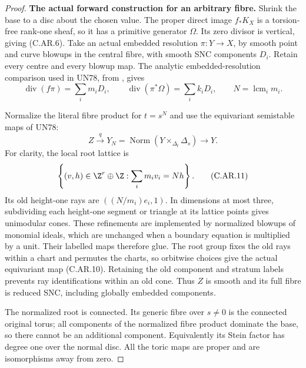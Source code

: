 \begin{proof}
\par\medskip\noindent\textbf{The actual forward construction for an arbitrary fibre.}
Shrink the base to a disc about the chosen value.
The proper direct image \(f_*K_X\) is a torsion-free
rank-one sheaf, so it has a primitive generator
\(\Omega\). Its zero divisor is vertical, giving
(C.AR.6). Take an actual embedded resolution
\(\pi:Y\to X\), by smooth point and curve blowups
in the central fibre, with smooth SNC components
\(D_i\). Retain every centre and every blowup map.
The analytic embedded-resolution comparison used
in UN78, from \cite{BierstoneMilman1997}, gives
\[
 \operatorname{div}(f\pi)=\sum_i m_iD_i,
 \qquad \operatorname{div}(\pi^*\Omega)=\sum_i k_iD_i,
 \qquad N=\operatorname{lcm}_i m_i.
 \tag{C.AR.9}
\]

Normalize the literal fibre product for \(t=s^N\)
and use the equivariant semistable maps of UN78:
\[
 Z\xrightarrow{q}Y_N
     =\operatorname{Norm}(Y\times_{\Delta_t}\Delta_s)
                   \longrightarrow Y.
 \tag{C.AR.10}
\]
For clarity, the local root lattice is
\[
 \left\{(v,h)\in\Z^r\oplus\Z:
                      \sum_i m_iv_i=Nh\right\}.
 \tag{C.AR.11}
\]
Its old height-one rays are \(((N/m_i)e_i,1)\).
In dimensions at most three, subdividing each
height-one segment or triangle at its lattice
points gives unimodular cones. These refinements
are implemented by normalized blowups of
monomial ideals, which are unchanged when a
boundary equation is multiplied by a unit.
Their labelled maps therefore glue. The root
group fixes the old rays within a chart and
permutes the charts, so orbitwise choices give
the actual equivariant map (C.AR.10). Retaining
the old component and stratum labels prevents
ray identifications within an old cone. Thus
\(Z\) is smooth and its full fibre is reduced
SNC, including globally embedded components.

The normalized root is connected. Its generic
fibre over \(s\ne0\) is the connected original
torus; all components of the normalized fibre
product dominate the base, so there cannot be
an additional component. Equivalently its
Stein factor has degree one over the normal
disc. All the toric maps are proper and are
isomorphisms away from zero.


\end{proof}
